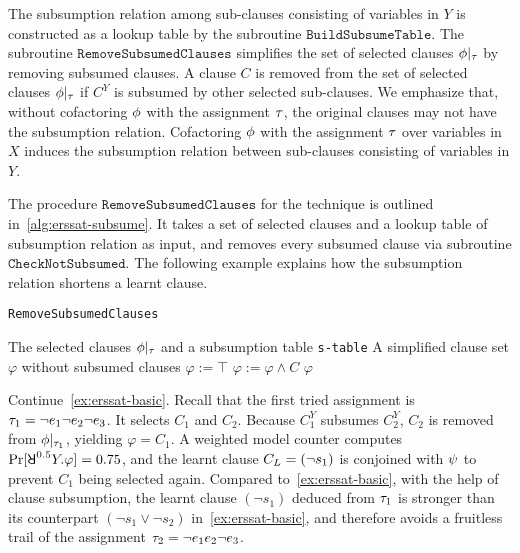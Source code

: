 The subsumption relation among sub-clauses consisting of variables in $Y$ is constructed as a lookup table by the subroutine $\mathtt{BuildSubsumeTable}$.
The subroutine $\texttt{RemoveSubsumedClauses}$ simplifies the set of selected clauses $\phi|_{\tau}$ by removing subsumed clauses.
A clause $C$ is removed from the set of selected clauses $\phi|_{\tau}$ if $C^Y$ is subsumed by other selected sub-clauses.
We emphasize that, without cofactoring $\phi$ with the assignment $\tau$,
the original clauses may not have the subsumption relation.
Cofactoring $\phi$ with the assignment $\tau$ over variables in $X$ induces the subsumption relation between sub-clauses consisting of variables in $Y$.

The procedure $\texttt{RemoveSubsumedClauses}$ for the technique is outlined in~\cref{alg:erssat-subsume}.
It takes a set of selected clauses and a lookup table of subsumption relation as input,
and removes every subsumed clause via subroutine $\texttt{CheckNotSubsumed}$.
The following example explains how the subsumption relation shortens a learnt clause.

\begin{algorithm}[ht]
    \caption{\texttt{RemoveSubsumedClauses}}
    \label{alg:erssat-subsume}
    \begin{algorithmic}[1]
        \REQUIRE The selected clauses $\phi|_{\tau}$ and a subsumption table \texttt{s-table}
        \ENSURE A simplified clause set $\varphi$ without subsumed clauses
        \STATE $\varphi := \top$
        \STATE $\varphi := \varphi \land C$
        \ENDIF
        \ENDFOR
        \RETURN $\varphi$
    \end{algorithmic}
\end{algorithm}

\begin{example}
    \label{ex:erssat-subsume}
    Continue~\cref{ex:erssat-basic}.
    Recall that the first tried assignment is $\tau_1=\lnot e_1 \lnot e_2 \lnot e_3$.
    It selects $C_1$ and $C_2$.
    Because $C_1^Y$ subsumes $C_2^Y$,
    $C_2$ is removed from $\phi|_{\tau_1}$, yielding $\varphi=C_1$.
    A weighted model counter computes $\spb{\random{0.5}Y.\varphi}=0.75$,
    and the learnt clause $C_L=(\lnot s_{1})$ is conjoined with $\psi$ to prevent $C_1$ being selected again.
    Compared to~\cref{ex:erssat-basic}, with the help of clause subsumption,
    the learnt clause $(\lnot s_1)$ deduced from $\tau_1$ is stronger than its counterpart $(\lnot s_1 \lor \lnot s_2)$ in~\cref{ex:erssat-basic},
    and therefore avoids a fruitless trail of the assignment $\tau_2=\lnot e_1 e_2 \lnot e_3$.
\end{example}

